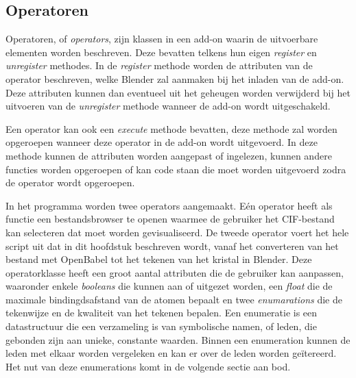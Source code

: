 \subsection{Operatoren}
Operatoren, of \textit{operators}, zijn klassen in een add-on waarin de uitvoerbare elementen worden beschreven. Deze bevatten telkens hun eigen \textit{register} en \textit{unregister} methodes. In de \textit{register} methode worden de attributen van de operator beschreven, welke Blender zal aanmaken bij het inladen van de add-on. Deze attributen kunnen dan eventueel uit het geheugen worden verwijderd bij het uitvoeren van de \textit{unregister} methode wanneer de add-on wordt uitgeschakeld. 
\par
Een operator kan ook een \textit{execute} methode bevatten, deze methode zal worden opgeroepen wanneer deze operator in de add-on wordt uitgevoerd. In deze methode kunnen de attributen worden aangepast of ingelezen, kunnen andere functies worden opgeroepen of kan code staan die moet worden uitgevoerd zodra de operator wordt opgeroepen.
\par
In het programma worden twee operators aangemaakt. Eén operator heeft als functie een bestandsbrowser te openen waarmee de gebruiker het CIF-bestand kan selecteren dat moet worden gevisualiseerd. De tweede operator voert het hele script uit dat in dit hoofdstuk beschreven wordt, vanaf het converteren van het bestand met OpenBabel tot het tekenen van het kristal in Blender. Deze operatorklasse heeft een groot aantal attributen die de gebruiker kan aanpassen, waaronder enkele \textit{booleans} die kunnen aan of uitgezet worden, een \textit{float} die de maximale bindingdsafstand van de atomen bepaalt en twee \textit{enumarations} die de tekenwijze en de kwaliteit van het tekenen bepalen. Een enumeratie is een datastructuur die een verzameling is van symbolische namen, of leden, die gebonden zijn aan unieke, constante waarden. Binnen een enumeration kunnen de leden met elkaar worden vergeleken en kan er over de leden worden geïtereerd.\citep*{ENUM} Het nut van deze enumerations komt in de volgende sectie aan bod.

